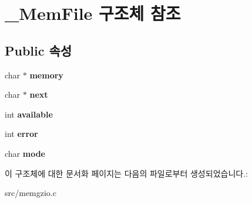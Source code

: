 \hypertarget{struct___mem_file}{}\section{\+\_\+\+Mem\+File 구조체 참조}
\label{struct___mem_file}
\subsection*{Public 속성}
\begin{DoxyCompactItemize}
\item 
\mbox{\label{struct___mem_file_a62a96f96df82e23ef6dace974e19b18c}} 
char $\ast$ {\bfseries memory}
\item 
\mbox{\label{struct___mem_file_aa15859f66ae2eb41245e4ba88486d67f}} 
char $\ast$ {\bfseries next}
\item 
\mbox{\label{struct___mem_file_a1f48066353e37cf16c9a0065abecf238}} 
int {\bfseries available}
\item 
\mbox{\label{struct___mem_file_a63100edd8050f287d8dc7070d92a55cb}} 
int {\bfseries error}
\item 
\mbox{\label{struct___mem_file_a88cb51a4419fad64ebfd304b5d0cfe36}} 
char {\bfseries mode}
\end{DoxyCompactItemize}


이 구조체에 대한 문서화 페이지는 다음의 파일로부터 생성되었습니다.\+:\begin{DoxyCompactItemize}
\item 
src/memgzio.\+c\end{DoxyCompactItemize}

